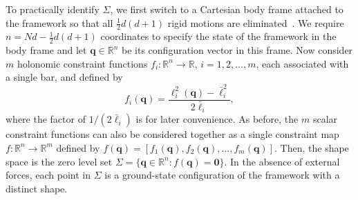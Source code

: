 To practically identify $\Sigma$, we first switch to a Cartesian body frame attached to the framework so that all $\frac{1}{2}d(d+1)$ rigid motions are eliminated~\cite{herschbach1959,echenique2011}.
We require $n = Nd - \frac{1}{2}d(d+1)$ coordinates to specify the state of the framework in the body frame and let $\bm{q} \in \mathbb{R}^{n}$ be its configuration vector in this frame.
Now consider $m$ holonomic constraint functions $f_i: \mathbb{R}^{n} \to \mathbb{R},\,i=1,2,\ldots,m$, each associated with a single bar, and defined by
%
\begin{equation}
  f_i(\bm{q}) = \frac{\ell_i^2(\bm{q}) - \bar{\ell}_i^2}{2\bar{\ell}_i},
  \label{eq:consmap}
\end{equation}
%
where the factor of $1/(2\bar{\ell}_i)$ is for later convenience.
As before, the $m$ scalar constraint functions can also be considered together as a single constraint map $f: \mathbb{R}^{n} \to \mathbb{R}^m$ defined by $f(\bm{q}) = [f_1(\bm{q}), f_2(\bm{q}), \ldots, f_m(\bm{q})]$.
Then, the shape space is the zero level set $\Sigma = \{\bm{q} \in \mathbb{R}^{n}: f(\bm{q}) = \bm{0}\}$.
In the absence of external forces, each point in $\Sigma$ is a ground-state configuration of the framework with a distinct shape.

